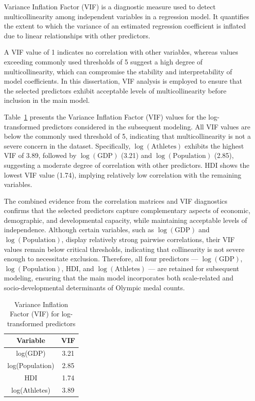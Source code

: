 \documentclass[11pt,twoside]{article}
\numberwithin{Theorem}{section}
\numberwithin{Definition}{section}
\numberwithin{Lemma}{section}
\numberwithin{Algorithm}{section}
\numberwithin{equation}{section}
\begin{document}
Variance Inflation Factor (VIF) is a diagnostic measure used to detect multicollinearity among independent variables in a regression model\cite{james2017isl}. 
It quantifies the extent to which the variance of an estimated regression coefficient is inflated due to linear relationships with other predictors. 

A VIF value of 1 indicates no correlation with other variables, whereas values exceeding commonly used thresholds of 5 suggest a high degree of multicollinearity\cite{sheather2009modern}, 
which can compromise the stability and interpretability of model coefficients. 
In this dissertation, VIF analysis is employed to ensure that the selected predictors exhibit acceptable levels of multicollinearity before inclusion in the main model.

Table~\ref{tab:vif_results} presents the Variance Inflation Factor (VIF) values for the log-transformed predictors considered in the subsequent modeling. 
All VIF values are below the commonly used threshold of 5, indicating that multicollinearity is not a severe concern in the dataset. 
Specifically, $\log(\mathrm{Athletes})$ exhibits the highest VIF of 3.89, followed by $\log(\mathrm{GDP})$ (3.21) and $\log(\mathrm{Population})$ (2.85), suggesting a moderate degree of correlation with other predictors. 
HDI shows the lowest VIF value (1.74), implying relatively low correlation with the remaining variables. 

The combined evidence from the correlation matrices and VIF diagnostics confirms that the selected predictors capture complementary aspects of economic, demographic, and developmental capacity, while maintaining acceptable levels of independence. 
Although certain variables, such as $\log(\mathrm{GDP})$ and $\log(\mathrm{Population})$, display relatively strong pairwise correlations, their VIF values remain below critical thresholds, indicating that collinearity is not severe enough to necessitate exclusion. 
Therefore, all four predictors --- $\log(\mathrm{GDP})$, $\log(\mathrm{Population})$, HDI, and $\log(\mathrm{Athletes})$ --- are retained for subsequent modeling, ensuring that the main model incorporates both scale-related and socio-developmental determinants of Olympic medal counts.


\begin{table}[htbp]
\centering
\caption{Variance Inflation Factor (VIF) for log-transformed predictors}
\label{tab:vif_results}
\begin{tabular}{cc}
\toprule
\textbf{Variable} & \textbf{VIF} \\
\midrule
log(GDP)         & 3.21 \\
log(Population)  & 2.85 \\
HDI              & 1.74 \\
log(Athletes)    & 3.89 \\
\bottomrule
\end{tabular}
\end{table}
\end{document}
